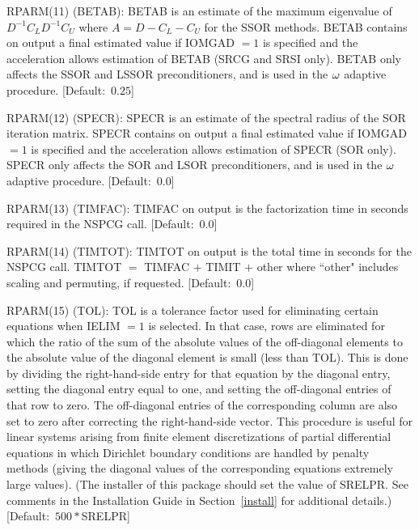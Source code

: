 \begin{list}{}{
               \leftmargin 1.00in \rightmargin 0.25in}
\item[RPARM(11) \hfill](BETAB):
         BETAB is an estimate of the maximum eigenvalue of
         $D^{-1}C_LD^{-1}C_U$ where $A=D-C_L-C_U$ for the SSOR
         methods.  BETAB contains on output a final estimated value
         if IOMGAD $= 1$ is specified and the acceleration allows
         estimation of BETAB  (SRCG and SRSI only).  BETAB only
         affects the SSOR and LSSOR preconditioners, and is used in
         the $\omega$ adaptive procedure.  \mbox{[Default: $0.25$]}
 
\item[RPARM(12) \hfill](SPECR):
         SPECR is an estimate of the spectral radius of the SOR
         iteration matrix.  SPECR contains on output a final
         estimated value if IOMGAD $= 1$ is specified and the
         acceleration allows estimation of SPECR (SOR only).
         SPECR only affects the SOR and LSOR preconditioners, and
         is used in the $\omega$ adaptive procedure. \mbox{[Default: $0.0$]}
 
\item[RPARM(13) \hfill](TIMFAC):
         TIMFAC on output is the factorization time in seconds
         required in the NSPCG call. \mbox{[Default: $0.0$]}
 
\item[RPARM(14) \hfill](TIMTOT):
         TIMTOT on output is the total time in seconds for the
         NSPCG call.  TIMTOT $=$ TIMFAC $+$ TIMIT $+$ other where
         ``other" includes scaling and permuting, if requested.
         \mbox{[Default: $0.0$]}
 
\item[RPARM(15) \hfill](TOL):
         TOL is a tolerance factor used for eliminating certain
         equations when IELIM $= 1$ is selected.  In that case,
         rows are eliminated for which the ratio of the sum of
         the absolute values of the off-diagonal elements to the
         absolute value of the diagonal element is small (less
         than TOL).  This is done by dividing the right-hand-side
         entry for that equation by the diagonal entry, setting
         the diagonal entry equal to one, and setting the
         off-diagonal entries of that row to zero.  The off-diagonal
         entries of the corresponding column are also set to zero
         after correcting the right-hand-side vector.  This
         procedure is useful for linear systems arising from
         finite element discretizations of partial differential
         equations in which Dirichlet boundary conditions are
         handled by penalty methods (giving the diagonal values
         of the corresponding equations extremely large values).
         (The installer of this package should set the value of
         SRELPR.  See comments in the Installation Guide in
         Section~\ref{install} for additional details.)
         \mbox{[Default: $500*$SRELPR]}
 

\end{list}
